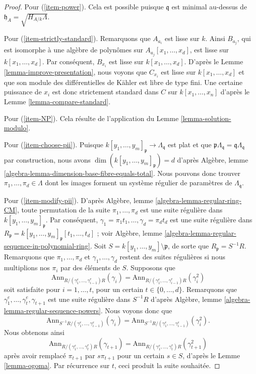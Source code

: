 \begin{proof}
\medskip\noindent
Pour (\ref{item-power}). Cela est possible puisque $\mathfrak q$ est minimal
au-dessus de $\mathfrak h_A = \sqrt{H_{A/k}\Lambda}$.

\medskip\noindent
Pour (\ref{item-strictly-standard}). Remarquons que $A_{a_i}$ est lisse
sur $k$. Ainsi $B_{a_j}$, qui est isomorphe à une algèbre de polynômes
sur $A_{a_j}[x_1, \ldots, x_d]$, est lisse sur
$k[x_1, \ldots, x_d]$. Par conséquent, $B_{x_i}$ est lisse sur $k[x_1, \ldots, x_d]$.
D'après le Lemme \ref{lemma-improve-presentation},
nous voyons que $C_{x_i}$ est lisse sur $k[x_1, \ldots, x_d]$
et que son module des différentielles de Kähler est libre de type fini. Une certaine puissance de
$x_i$ est donc strictement standard dans $C$ sur $k[x_1, \ldots, x_n]$
d'après le Lemme \ref{lemma-compare-standard}.

\medskip\noindent
Pour (\ref{item-NP}). Cela résulte de l'application du Lemme \ref{lemma-solution-modulo}.

\medskip\noindent
Pour (\ref{item-choose-pii}). Puisque
$k[y_1, \ldots, y_m]_\mathfrak p \to \Lambda_\mathfrak q$
est plat et que $\mathfrak p \Lambda_\mathfrak q = \mathfrak q \Lambda_\mathfrak q$
par construction,
nous avons $\dim(k[y_1, \ldots, y_m]_\mathfrak p) = d$ d'après
Algèbre, lemme \ref{algebra-lemma-dimension-base-fibre-equals-total}.
Nous pouvons donc trouver $\pi_1, \ldots, \pi_d \in \Lambda$ dont les images forment
un système régulier de paramètres de $\Lambda_\mathfrak q$.

\medskip\noindent
Pour (\ref{item-modify-pii}). D'après
Algèbre, lemme \ref{algebra-lemma-regular-ring-CM},
toute permutation de la suite $\pi_1, \ldots, \pi_d$ est une
suite régulière dans $k[y_1, \ldots, y_m]_\mathfrak p$. Par conséquent,
$\gamma_1 = \pi_1 t_1, \ldots, \gamma_d = \pi_d t_d$ est une suite
régulière dans
$R_\mathfrak p = k[y_1, \ldots, y_m]_\mathfrak p[t_1, \ldots, t_d]$ ; voir
Algèbre, lemme \ref{algebra-lemma-regular-sequence-in-polynomial-ring}.
Soit $S = k[y_1, \ldots, y_m] \setminus \mathfrak p$, de sorte que
$R_\mathfrak p = S^{-1}R$. Remarquons que $\pi_1, \ldots, \pi_d$
et $\gamma_1, \ldots, \gamma_d$
restent des suites régulières si nous multiplions nos $\pi_i$ par des éléments de $S$.
Supposons que
$$
\text{Ann}_{R/(\gamma_1^e, \ldots, \gamma_{i - 1}^e)R}(\gamma_i)
=
\text{Ann}_{R/(\gamma_1^e, \ldots, \gamma_{i - 1}^e)R}(\gamma_i^2)
$$
soit satisfaite pour $i = 1, \ldots, t$, pour un certain $t \in \{0, \ldots, d\}$. Remarquons que
$\gamma_1^e, \ldots, \gamma_t^e, \gamma_{t + 1}$ est une
suite régulière dans $S^{-1}R$ d'après
Algèbre, lemme \ref{algebra-lemma-regular-sequence-powers}.
Nous voyons donc que
$$
\text{Ann}_{S^{-1}R/(\gamma_1^e, \ldots, \gamma_{i - 1}^e)}(\gamma_i) =
\text{Ann}_{S^{-1}R/(\gamma_1^e, \ldots, \gamma_{i - 1}^e)}(\gamma_i^2).
$$
Nous obtenons ainsi
$$
\text{Ann}_{R/(\gamma_1^e, \ldots, \gamma_t^e)R}(\gamma_{t + 1})
=
\text{Ann}_{R/(\gamma_1^e, \ldots, \gamma_t^e)R}(\gamma_{t + 1}^2)
$$
après avoir remplacé $\pi_{t + 1}$ par $s\pi_{t + 1}$ pour un certain $s \in S$, d'après le
Lemme \ref{lemma-ogoma}. Par récurrence sur $t$, ceci produit la
suite souhaitée.


\end{proof}
